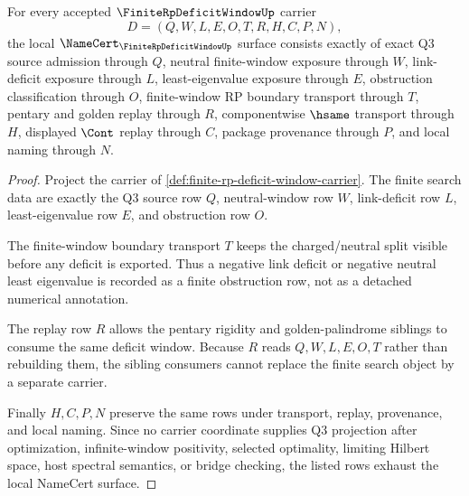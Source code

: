 \begin{theorem}
\label{thm:finite-rp-deficit-window-namecert-obligations}
For every accepted $\FiniteRpDeficitWindowUp$ carrier
$$
D=(Q,W,L,E,O,T,R,H,C,P,N),
$$
the local $\NameCert_{\FiniteRpDeficitWindowUp}$ surface consists exactly of exact Q3 source admission through $Q$, neutral finite-window exposure through $W$, link-deficit exposure through $L$, least-eigenvalue exposure through $E$, obstruction classification through $O$, finite-window RP boundary transport through $T$, pentary and golden replay through $R$, componentwise $\hsame$ transport through $H$, displayed $\Cont$ replay through $C$, package provenance through $P$, and local naming through $N$.
\end{theorem}
\begin{proof}
Project the carrier of \autoref{def:finite-rp-deficit-window-carrier}. The finite search data are exactly the Q3 source row $Q$, neutral-window row $W$, link-deficit row $L$, least-eigenvalue row $E$, and obstruction row $O$.

The finite-window boundary transport $T$ keeps the charged/neutral split visible before any deficit is exported. Thus a negative link deficit or negative neutral least eigenvalue is recorded as a finite obstruction row, not as a detached numerical annotation.

The replay row $R$ allows the pentary rigidity and golden-palindrome siblings to consume the same deficit window. Because $R$ reads $Q,W,L,E,O,T$ rather than rebuilding them, the sibling consumers cannot replace the finite search object by a separate carrier.

Finally $H,C,P,N$ preserve the same rows under transport, replay, provenance, and local naming. Since no carrier coordinate supplies Q3 projection after optimization, infinite-window positivity, selected optimality, limiting Hilbert space, host spectral semantics, or bridge checking, the listed rows exhaust the local NameCert surface.
\end{proof}

